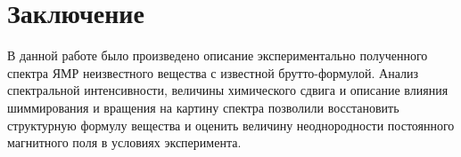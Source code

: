 \section{Заключение}
В данной работе было произведено описание экспериментально полученного спектра ЯМР неизвестного вещества с известной брутто-формулой. Анализ спектральной интенсивности, величины химического сдвига и описание влияния шиммирования и вращения на картину спектра позволили восстановить структурную формулу вещества и оценить величину неоднородности постоянного магнитного поля в условиях эксперимента.

\printbibliography
